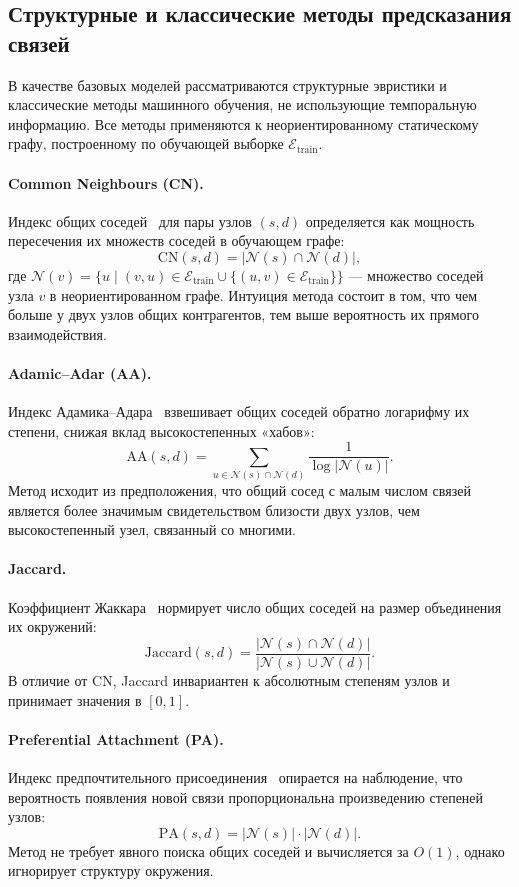 \documentclass[a4paper,12pt]{extarticle}
\begin{document}
\subsection{Структурные и классические методы предсказания связей}

В качестве базовых моделей рассматриваются структурные эвристики и классические методы машинного обучения, не использующие темпоральную информацию. Все методы применяются к неориентированному статическому графу, построенному по обучающей выборке $\mathcal{E}_{\text{train}}$.

\paragraph{Common Neighbours (CN).}
Индекс общих соседей~\cite{liben2007link} для пары узлов $(s, d)$ определяется как мощность пересечения их множеств соседей в обучающем графе:
\[
\text{CN}(s, d) = |\mathcal{N}(s) \cap \mathcal{N}(d)|,
\]
где $\mathcal{N}(v) = \{u \mid (v, u) \in \mathcal{E}_{\text{train}} \cup \{(u, v) \in \mathcal{E}_{\text{train}}\}\}$ — множество соседей узла $v$ в неориентированном графе. Интуиция метода состоит в том, что чем больше у двух узлов общих контрагентов, тем выше вероятность их прямого взаимодействия.

\paragraph{Adamic--Adar (AA).}
Индекс Адамика--Адара~\cite{adamic2003friends} взвешивает общих соседей обратно логарифму их степени, снижая вклад высокостепенных «хабов»:
\[
\text{AA}(s, d) = \sum_{u \in \mathcal{N}(s) \cap \mathcal{N}(d)} \frac{1}{\log |\mathcal{N}(u)|}.
\]
Метод исходит из предположения, что общий сосед с малым числом связей является более значимым свидетельством близости двух узлов, чем высокостепенный узел, связанный со многими.

\paragraph{Jaccard.}
Коэффициент Жаккара~\cite{liben2007link} нормирует число общих соседей на размер объединения их окружений:
\[
\text{Jaccard}(s, d) = \frac{|\mathcal{N}(s) \cap \mathcal{N}(d)|}{|\mathcal{N}(s) \cup \mathcal{N}(d)|}.
\]
В отличие от CN, Jaccard инвариантен к абсолютным степеням узлов и принимает значения в $[0, 1]$.

\paragraph{Preferential Attachment (PA).}
Индекс предпочтительного присоединения~\cite{barabasi1999emergence} опирается на наблюдение, что вероятность появления новой связи пропорциональна произведению степеней узлов:
\[
\text{PA}(s, d) = |\mathcal{N}(s)| \cdot |\mathcal{N}(d)|.
\]
Метод не требует явного поиска общих соседей и вычисляется за $O(1)$, однако игнорирует структуру окружения.
\end{document}
